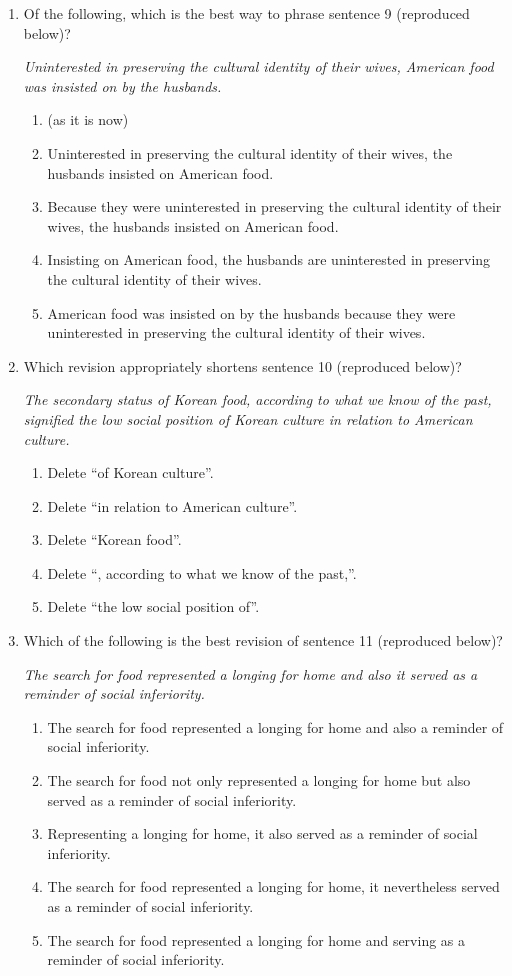 \begin{enumerate}
\item Of the following, which is the best way to phrase sentence 9 (reproduced below)?

\textit{Uninterested in preserving the cultural identity of their wives, American food was insisted on by the husbands.}

\begin{enumerate}[label=(\Alph*)]
\item (as it is now)
\item Uninterested in preserving the cultural identity of their wives, the husbands insisted on American food.
\item Because they were uninterested in preserving the cultural identity of their wives, the husbands insisted on American food.
\item Insisting on American food, the husbands are uninterested in preserving the cultural identity of their wives.
\item American food was insisted on by the husbands because they were uninterested in preserving the cultural identity of their wives.
\end{enumerate}

\item Which revision appropriately shortens sentence 10 (reproduced below)?

\textit{The secondary status of Korean food, according to what we know of the past, signified the low social position of Korean culture in relation to American culture.}

\begin{enumerate}[label=(\Alph*)]
\item Delete “of Korean culture”.
\item Delete “in relation to American culture”.
\item Delete “Korean food”.
\item Delete “, according to what we know of the past,”.
\item Delete “the low social position of”.
\end{enumerate}

\item Which of the following is the best revision of sentence 11 (reproduced below)?

\textit{The search for food represented a longing for home and also it served as a reminder of social inferiority.}

\begin{enumerate}[label=(\Alph*)]
\item The search for food represented a longing for home and also a reminder of social inferiority.
\item The search for food not only represented a longing for home but also served as a reminder of social inferiority.
\item Representing a longing for home, it also served as a reminder of social inferiority.
\item The search for food represented a longing for home, it nevertheless served as a reminder of social inferiority.
\item The search for food represented a longing for home and serving as a reminder of social inferiority.


\end{enumerate}
\end{enumerate}
